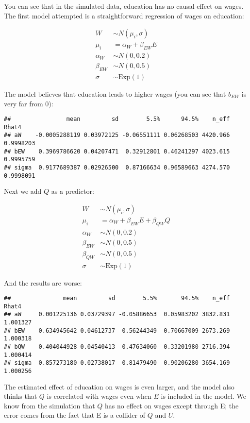 \documentclass[
]{book}
\begin{document}
You can see that in the simulated data, education has no causal effect on wages. The first model attempted is a straightforward regression of wages on education:

\[
\begin{aligned}
W &\sim N(\mu_i, \sigma)\\
\mu_i &= \alpha_W + \beta_{EW}E\\
\alpha_W &\sim N(0,0.2)\\
\beta_{EW} &\sim N(0,0.5)\\
\sigma &\sim \text{Exp}(1)
\end{aligned}
\]

The model believes that education leads to higher wages (you can see that \(b_{EW}\) is very far from 0):

\begin{verbatim}
##                mean         sd        5.5%      94.5%    n_eff     Rhat4
## aW    -0.0005288119 0.03972125 -0.06551111 0.06268503 4420.966 0.9998203
## bEW    0.3969786620 0.04207471  0.32912801 0.46241297 4023.615 0.9995759
## sigma  0.9177689387 0.02926500  0.87166634 0.96589663 4274.570 0.9998091
\end{verbatim}

Next we add \(Q\) as a predictor:

\[
\begin{aligned}
W &\sim N(\mu_i, \sigma)\\
\mu_i &= \alpha_W + \beta_{EW}E + \beta_{QW}Q\\
\alpha_W &\sim N(0,0.2)\\
\beta_{EW} &\sim N(0,0.5)\\
\beta_{QW} &\sim N(0,0.5)\\
\sigma &\sim \text{Exp}(1)
\end{aligned}
\]

And the results are worse:

\begin{verbatim}
##               mean         sd        5.5%       94.5%    n_eff    Rhat4
## aW     0.001225136 0.03729397 -0.05886653  0.05983202 3832.831 1.001327
## bEW    0.634945642 0.04612737  0.56244349  0.70667009 2673.269 1.000318
## bQW   -0.404044928 0.04540413 -0.47634060 -0.33201980 2716.394 1.000414
## sigma  0.857273180 0.02738017  0.81479490  0.90206280 3654.169 1.000256
\end{verbatim}

The estimated effect of education on wages is even larger, and the model also thinks that \(Q\) is correlated with wages even when \(E\) is included in the model. We know from the simulation that \(Q\) has no effect on wages except through E; the error comes from the fact that E is a collider of \(Q\) and \(U\).
\end{document}
